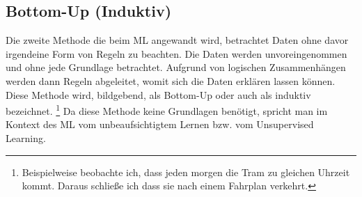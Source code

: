 \documentclass[12pt,german,ngerman]{report}
\begin{document}
           
        
    \subsection{Bottom-Up (Induktiv)}
        Die zweite Methode die beim ML angewandt wird, betrachtet Daten ohne davor irgendeine Form von Regeln zu beachten.  
        Die Daten werden unvoreingenommen und ohne jede Grundlage betrachtet.
        Aufgrund von logischen Zusammenhängen werden dann Regeln abgeleitet, womit sich die Daten erklären lassen können.
        Diese Methode wird, bildgebend, als Bottom-Up oder auch als induktiv\cite{dundi2021unileipzig} bezeichnet.
        \footnote{Beispielweise beobachte ich, dass jeden morgen die Tram zu gleichen Uhrzeit kommt. Daraus schließe ich 
        dass sie nach einem Fahrplan verkehrt.}
        Da diese Methode keine Grundlagen benötigt, spricht man
        im Kontext des ML vom unbeaufsichtigtem Lernen bzw. vom Unsupervised Learning.
\end{document}
